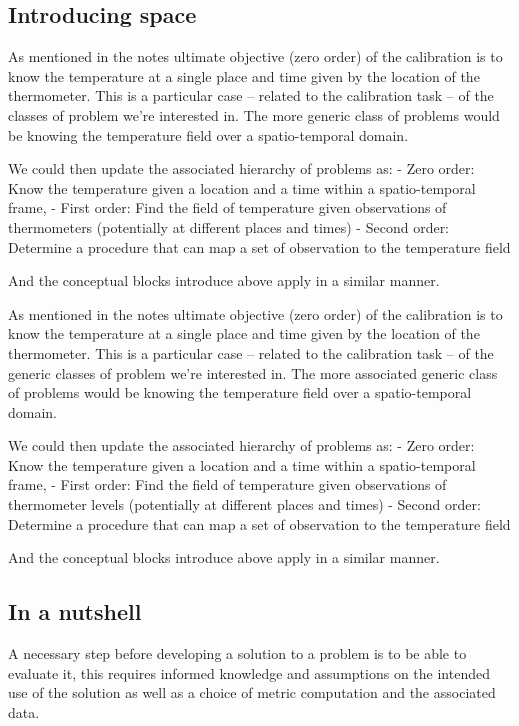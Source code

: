 \begin{bibunit}
\subsection{Introducing space}
  As mentioned in the notes ultimate objective (zero order) of the calibration is to know the temperature at a single place and time given by the location of the thermometer. 
  This is a particular case  -- related to the calibration task  -- of the classes of problem we're interested in.
  The more generic class of problems would be knowing the temperature field over a spatio-temporal domain.

We could then update the associated hierarchy of problems as:
  - Zero order: Know the temperature given a location and a time within a spatio-temporal frame, 
  - First order: Find the field of temperature given observations of thermometers (potentially at different places and times)
  - Second order: Determine a procedure that can map a set of observation to the temperature field

And the conceptual blocks introduce above apply in a similar manner.


  As mentioned in the notes ultimate objective (zero order) of the calibration is to know the temperature at a single place and time given by the location of the thermometer. 
  This is a particular case  -- related to the calibration task  -- of the generic classes of problem we're interested in.
  The more associated generic class of problems would be knowing the temperature field over a spatio-temporal domain.

We could then update the associated hierarchy of problems as:
  - Zero order: Know the temperature given a location and a time within a spatio-temporal frame, 
  - First order: Find the field of temperature given observations of thermometer levels (potentially at different places and times)
  - Second order: Determine a procedure that can map a set of observation to the temperature field

And the conceptual blocks introduce above apply in a similar manner.


\subsection{In a nutshell}

A necessary step before developing a solution to a problem is to be able to evaluate it, this requires informed knowledge and assumptions on the intended use of the solution as well as a choice of metric computation and the associated data.


\end{bibunit}
